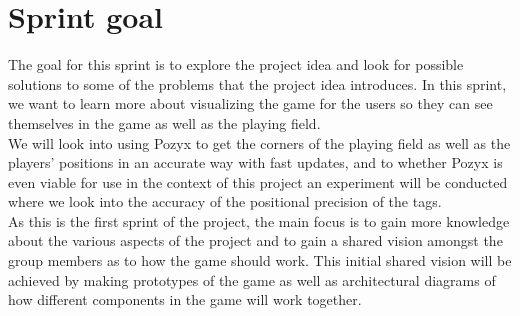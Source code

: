 \section{Sprint goal}\label{sec:sprint1-goals}
The goal for this sprint is to explore the project idea and look for possible solutions to some of the problems that the project idea introduces.
In this sprint, we want to learn more about visualizing the game for the users so they can see themselves in the game as well as the playing field. \\
We will look into using Pozyx to get the corners of the playing field as well as the players' positions in an accurate way with fast updates, and to whether Pozyx is even viable for use in the context of this project an experiment will be conducted where we look into the accuracy of the positional precision of the tags. \\
As this is the first sprint of the project, the main focus is to gain more knowledge about the various aspects of the project and to gain a shared vision amongst the group members as to how the game should work.
This initial shared vision will be achieved by making prototypes of the game as well as architectural diagrams of how different components in the game will work together.
